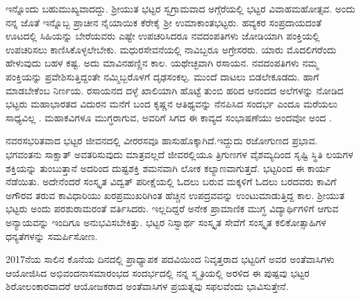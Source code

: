 {ಇನ್ನೊಂದು ಬಹುಮುಖ್ಯವಾದದ್ದು. ಶ್ರೀಯುತ ಭಟ್ಟರ ಸ್ವಗ್ರಾಮವಾದ ಅಗ್ಗೆರೆಯಲ್ಲಿ ಭಟ್ಟರ ವಿವಾಹಮಹೋತ್ಸವ. ಅಂದು ನನ್ನ ಜೊತೆ ಇನ್ನೊಬ್ಬ ಪ್ರಾಚೀನ ನೈಯಾಯಿಕ ಕೆರೇಕೈ ಶ್ರೀ ಉಮಾಕಾಂತಭಟ್ಟರು. ಹವ್ಯಕರ ಸಂಪ್ರದಾಯದಂತೆ ಊಟದಲ್ಲಿ ಸಿಹಿಯನ್ನು ಬೇರೆಯವರು ಎಷ್ಟೇ ಉಪಚರಿಸಿದರೂ ನವದಂಪತಿಗಳು ಜೋಡಿಯಾಗಿ ಪಂಕ್ತಿಯಲ್ಲಿ ಉಪಚರಿಸಲು ಕಾಣಿಸಿಕೊಳ್ಳಲೇಬೇಕು. ಮಧುರಸೇವನೆಯಲ್ಲಿ ನಾವಿಬ್ಬರೂ ಅಗ್ರೇಸರರು. ಯಾರು ಮೊದಲಿಗರೆಂದು ಹೇಳುವುದು ಬಹಳ ಕಷ್ಟ. ಅದು ಮಾವಿನಹಣ್ಣಿನ ಕಾಲ. ಯಥೇಚ್ಛವಾಗಿ ರಸಾಯನ. ನವದಂಪತಿಗಳು ನಮ್ಮ ಪಂಕ್ತಿಯನ್ನು ಪ್ರವೇಶಿಸುತ್ತಿದ್ದಂತೇ ನಮ್ಮಿಬ್ಬರೊಳಗೆ ದೃಢಸಂಕಲ್ಪ. ಮುಂದೆ ದಾಟಲು ಬಿಡಲೇಕೂಡದು. ಹಾಗೆ ಮಾಡಬೇಕೆಂಬ ನಿರ್ಣಯ. ರಸಾಯನದ ದಳ್ಳೆ ಖಾಲಿಯಾಗಿ ಹೊಟ್ಟೆ ತುಂಬಿ ಹರಿದ ಆನಂದದ ಅಲೆಗಳನ್ನು ನೋಡಿದ ಭಟ್ಟರು ಮಹಾಭಾರತದ ವಿದುರನ ಮನೆಗೆ ಬಂದ ಕೃಷ್ಣನ ಆತಿಥ್ಯವನ್ನು ನೆನಪಿಸಿದ ಸಂದರ್ಭ ಎಂದೂ ಮರೆಯಲು ಸಾಧ್ಯವಿಲ್ಲ . ಮಹಾಕವಿಗಳೂ ಮುಗ್ಧರಾಗುವ, ಅವರಿಗೆ ಸಿಗದ ಈ ಕಾವ್ಯದ ಸಂಭಾಷಣೆಯು ಅಂದವೋ ಅಂದ .

ನವರಸಭರಿತವಾದ ಭಟ್ಟರ ಜೀವನದಲ್ಲಿ ವೀರರಸವೂ ಹಾಸುಹೊಕ್ಕಾಗಿದೆ.ಇದ್ದುದು ರಜೋಗುಣದ ಪ್ರಭಾವ. ಭಗವಂತನು ಸಾಕ್ಷಾತ್ ಅವತರಿಸುವುದು ಮಾತ್ರವಲ್ಲದೆ ಜೀವರಲ್ಲಿಯೂ ತ್ರಿಗುಣಗಳ ವೈಶಮ್ಯದಿಂದ ಸೃಷ್ಟಿ  \enginline{-}  ಸ್ಥಿತಿ  \enginline{-}  ಲಯಗಳ ಶಕ್ತಿಯನ್ನು ತುಂಬುತ್ತಾನೆ ಅದರಿಂದ ದುಷ್ಟಶಕ್ತಿ ಶಮನವಾಗಿ \break ಲೋಕ ಕಲ್ಯಾಣವಾಗುತ್ತದೆ. ಭಟ್ಟರಿಂದ ಈ ಕಾರ್ಯ ನೆಡೆಯಿತು. ಅದೇನೆಂದರೆ ಸಂಸ್ಕೃತ ವಿದ್ವತ್ ಪರೀಕ್ಷೆಯಲ್ಲಿ ಓದಲು ಬರುವ ಮಕ್ಕಳಿಗೆ ಓದಲು ಬರದವರು ಕಾವಿಗೆ ಅಗೌರವ ತರುವ ಕಾವಿಧಾರಿಯು ಖರಪ್ರಮುಖರಿಗಿಂತ ಹೆಚ್ಚಿನ ಉಪದ್ರವವನ್ನು ಉಂಟುಮಾಡುತ್ತಿದ್ದ ಕಾಲ. ಶ್ರೀಯುತ ಭಟ್ಟರು ಅಂದು ಪರಶುರಾಮರಂತೆ ವರ್ತಿಸಿದರು. ಇಲ್ಲದಿದ್ದರೆ ಅನೇಕ ಪ್ರಾಮಾಣಿಕ ಮುಗ್ಧ ವಿದ್ಯಾರ್ಥಿಗಳಿಗೆ ಆಗುವ ಅನ್ಯಾಯವನ್ನು ಇಂದಿಗೂ ಅನುಭವಿಸಬೇಕಿತ್ತು. ಭಟ್ಟರ ನಿಸ್ವಾರ್ಥ ಸಂಸ್ಕೃತ ಸೇವೆಗೆ ಸಂಸ್ಕೃತ ಕಲಿಕೋತ್ಸಾಹಿಗಳ ಧನ್ಯತೆಗಳನ್ನು ಸಮರ್ಪಿಸೋಣ.


2017ನೆಯ ಸಾಲಿನ ಕೊನೆಯ ದಿನದಲ್ಲಿ ಪ್ರಾಧ್ಯಾಪಕ ಪದವಿಯಿಂದ ನಿವೃತ್ತರಾದ ಭಟ್ಟರಿಗೆ ಅವರ ಅಂತೆವಾಸಿಗಳು ಆಯೋಜಿಸಿದ ಅಭಿವಂದನಾಸಮಾರಂಭದ ಸಂದರ್ಭದಲ್ಲಿ ನನ್ನ ಸ್ಮೃತಿಯಲ್ಲಿ ಅರಳಿದ ಈ ಪುಷ್ಪವು ಭಟ್ಟರ ಶಿರೋಲಂಕಾರವಾದರೆ  ಆಯೋಜಕರಾದ ಅಂತೆವಾಸಿಗಳ ಪ್ರಯತ್ನವು ಸಫಲವೆಂದು ಭಾವಿಸುತ್ತೇನೆ.

\articleend
}
